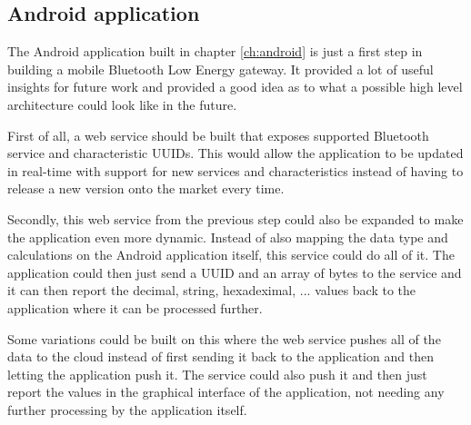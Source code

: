\documentclass[pdftex,a4paper,12pt,twoside]{report}
\begin{document}
\subsection{Android application}
\label{subsec:androidapp}
The Android application built in chapter \ref{ch:android} is just a first step in building a mobile Bluetooth Low Energy gateway. It provided a lot of useful insights for future work and provided a good idea as to what a possible high level architecture could look like in the future.

First of all, a web service should be built that exposes supported Bluetooth service and characteristic UUIDs. This would allow the application to be updated in real-time with support for new services and characteristics instead of having to release a new version onto the market every time.

Secondly, this web service from the previous step could also be expanded to make the application even more dynamic. Instead of also mapping the data type and calculations on the Android application itself, this service could do all of it. The application could then just send a UUID and an array of bytes to the service and it can then report the decimal, string, hexadeximal, ... values back to the application where it can be processed further.

Some variations could be built on this where the web service pushes all of the data to the cloud instead of first sending it back to the application and then letting the application push it. The service could also push it and then just report the values in the graphical interface of the application, not needing any further processing by the application itself.





\listoffigures
\listoftables
\end{document}

